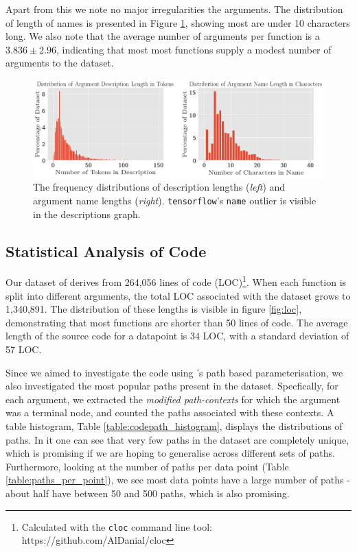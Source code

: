 Apart from this we note no major irregularities the arguments. The distribution of length of names is presented in Figure  \ref{fig:length_dist}, showing most are under 10 characters long.  We also note that the average number of arguments per function is a $3.836 \pm 2.96$, indicating that most most functions supply a modest number of arguments to the dataset.
\begin{figure}[tb]
    \centering
    \includegraphics[width=\linewidth]{ImagesCodeRelated/length_distribution.png}
    \caption{The frequency distributions of description lengths (\textit{left}) and argument name lengths (\textit{right}). 
    \texttt{tensorflow}'s \texttt{name} outlier is visible in the descriptions graph.}
    \label{fig:length_dist}
\end{figure}

\subsection{Statistical Analysis of Code} %
\label{sub:statistical_analysis_of_code}

Our dataset of derives from 264,056 lines of code (LOC)\footnote{Calculated with the \texttt{cloc} command line tool: https://github.com/AlDanial/cloc}.
When each function is split into different arguments, the total LOC associated with the dataset grows to 1,340,891. The distribution of these lengths is visible in figure \ref{fig:loc}, demonstrating that most functions are shorter than 50 lines of code.
The average length of the source code for a datapoint is 34 LOC, with a standard deviation of 57 LOC.

Since we aimed to investigate the code using \citet{alon_general_2018}'s path based parameterisation, we also investigated the most popular paths present in the dataset. Specfically, for each argument, we extracted the \textit{modified path-contexts} for which the argument was a terminal node, and counted the paths associated with these contexts.
A table histogram, Table \ref{table:codepath_histogram}, displays the distributions of paths. 
In it one can see that very few paths in the dataset are completely unique, which is promising if we are hoping to generalise across different sets of paths.
Furthermore, looking at the number of paths per data point (Table \ref{table:paths_per_point}), we see most data points have a large number of paths - about half have between 50 and 500 paths, which is also promising.

